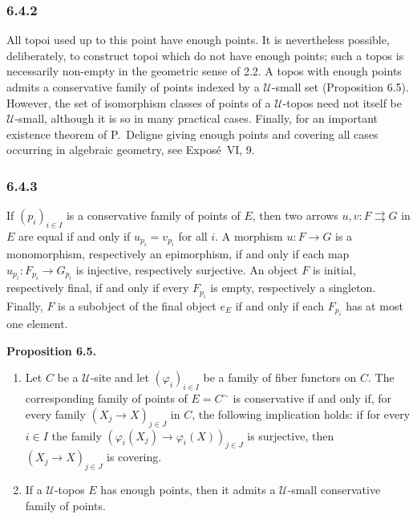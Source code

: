 \documentclass[11pt]{article}
\newcommand{\U}{\mathcal{U}}
\newenvironment{statement}[1]{\par\medskip\noindent\textbf{#1.}\ }{\par\medskip}
\begin{document}
\subsubsection*{6.4.2}
All topoi used up to this point have enough points. It is nevertheless possible, deliberately, to construct topoi which do not have enough points; such a topos is necessarily non-empty in the geometric sense of 2.2. A topos with enough points admits a conservative family of points indexed by a \(\U\)-small set (Proposition 6.5). However, the set of isomorphism classes of points of a \(\U\)-topos need not itself be \(\U\)-small, although it is so in many practical cases. Finally, for an important existence theorem of P.~Deligne giving enough points and covering all cases occurring in algebraic geometry, see Expos\'e~VI, 9.

\subsubsection*{6.4.3}
If \((p_i)_{i\in I}\) is a conservative family of points of \(E\), then two arrows \(u,v:F\rightrightarrows G\) in \(E\) are equal if and only if \(u_{p_i}=v_{p_i}\) for all \(i\). A morphism \(u:F\to G\) is a monomorphism, respectively an epimorphism, if and only if each map \(u_{p_i}:F_{p_i}\to G_{p_i}\) is injective, respectively surjective. An object \(F\) is initial, respectively final, if and only if every \(F_{p_i}\) is empty, respectively a singleton. Finally, \(F\) is a subobject of the final object \(e_E\) if and only if each \(F_{p_i}\) has at most one element.

\begin{statement}{Proposition 6.5}
\begin{enumerate}[label=\alph*)]
\item Let \(C\) be a \(\U\)-site and let \((\varphi_i)_{i\in I}\) be a family of fiber functors on \(C\). The corresponding family of points of \(E=C^{\sim}\) is conservative if and only if, for every family \((X_j\to X)_{j\in J}\) in \(C\), the following implication holds: if for every \(i\in I\) the family \((\varphi_i(X_j)\to\varphi_i(X))_{j\in J}\) is surjective, then \((X_j\to X)_{j\in J}\) is covering.
\item If a \(\U\)-topos \(E\) has enough points, then it admits a \(\U\)-small conservative family of points.
\end{enumerate}
\end{statement}
\end{document}
